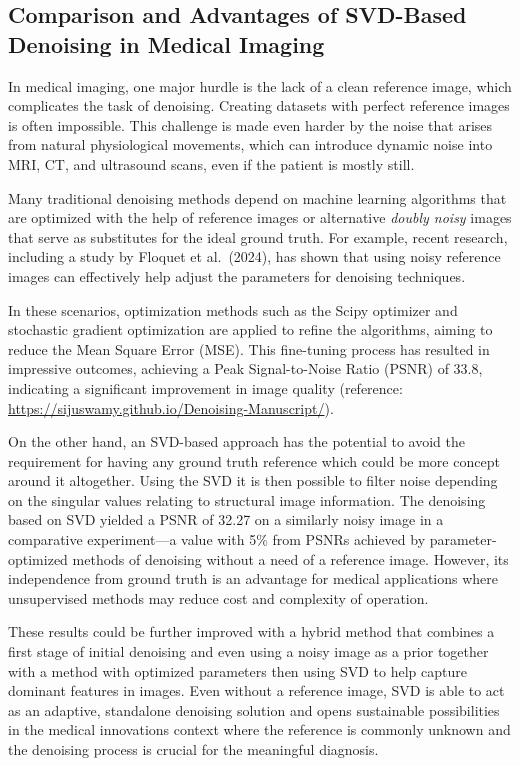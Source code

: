 \documentclass[
  journal,
]{IEEEtran}%
\begin{document}
\subsection{Comparison and Advantages of SVD-Based Denoising in Medical
Imaging}\label{comparison-and-advantages-of-svd-based-denoising-in-medical-imaging}

In medical imaging, one major hurdle is the lack of a clean reference
image, which complicates the task of denoising. Creating datasets with
perfect reference images is often impossible. This challenge is made
even harder by the noise that arises from natural physiological
movements, which can introduce dynamic noise into MRI, CT, and
ultrasound scans, even if the patient is mostly still.

Many traditional denoising methods depend on machine learning algorithms
that are optimized with the help of reference images or alternative
\emph{doubly noisy} images that serve as substitutes for the ideal
ground truth. For example, recent research, including a study by Floquet
et al.~(2024), has shown that using noisy reference images can
effectively help adjust the parameters for denoising techniques.

In these scenarios, optimization methods such as the Scipy optimizer and
stochastic gradient optimization are applied to refine the algorithms,
aiming to reduce the Mean Square Error (MSE). This fine-tuning process
has resulted in impressive outcomes, achieving a Peak Signal-to-Noise
Ratio (PSNR) of 33.8, indicating a significant improvement in image
quality (reference:
\url{https://sijuswamy.github.io/Denoising-Manuscript/}).

On the other hand, an SVD-based approach has the potential to avoid the
requirement for having any ground truth reference which could be more
concept around it altogether. Using the SVD it is then possible to
filter noise depending on the singular values relating to structural
image information. The denoising based on SVD yielded a PSNR of 32.27 on
a similarly noisy image in a comparative experiment---a value with 5\%
from PSNRs achieved by parameter-optimized methods of denoising without
a need of a reference image. However, its independence from ground truth
is an advantage for medical applications where unsupervised methods may
reduce cost and complexity of operation.

These results could be further improved with a hybrid method that
combines a first stage of initial denoising and even using a noisy image
as a prior together with a method with optimized parameters then using
SVD to help capture dominant features in images. Even without a
reference image, SVD is able to act as an adaptive, standalone denoising
solution and opens sustainable possibilities in the medical innovations
context where the reference is commonly unknown and the denoising
process is crucial for the meaningful diagnosis.
\end{document}
